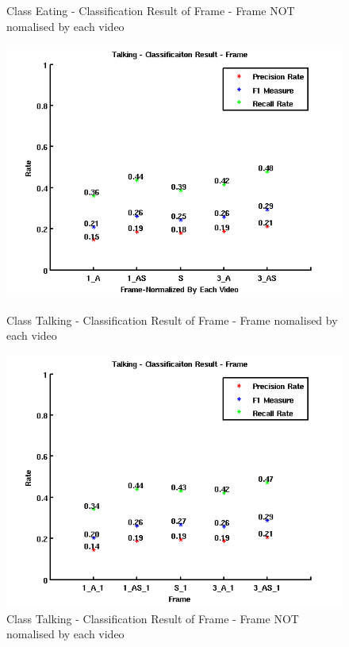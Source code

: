 \begin{figure}[ht]
\begin{minipage}{.5\textwidth}
  \caption{Class Eating - Classification Result of Frame - Frame NOT nomalised by each video}
  \label{fig:RES1}
\end{minipage}
\end{figure}

\begin{figure}[ht]
\centering
\begin{minipage}{.5\textwidth}
  \centering
  \captionsetup{justification=centering,margin=1cm}
  \includegraphics[width=\linewidth]{imgs/Result_Talking_Frame.png}
  \caption{Class Talking - Classification Result of Frame - Frame nomalised by each video}
  \label{fig:RTF}
\end{minipage}%
\begin{minipage}{.5\textwidth}
  \centering
  \captionsetup{justification=centering,margin=1cm}
  \includegraphics[width=\linewidth]{imgs/Result_Talking_Frame_1.png}
  \caption{Class Talking - Classification Result of Frame - Frame NOT nomalised by each video}
  \label{fig:RTF1}
\end{minipage}
\end{figure}

